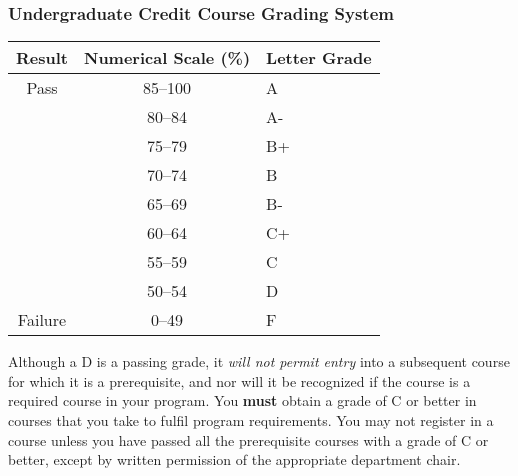 \subsubsection{Undergraduate Credit Course Grading System}

\begin{center}
  \begin{tabular}{ccl}
     Result & Numerical Scale (\%) & Letter Grade \\
   \hline
Pass & 85--100 & A  \\
& 80--84 & A- \\
& 75--79 & B+ \\
& 70--74 & B \\
& 65--69 & B- \\
& 60--64& C+ \\
& 55--59 & C \\
& 50--54 & D \\
\hline
Failure & 0--49 & F 
  \end{tabular}
  \end{center}

Although a D is a passing grade, it {\em will not permit entry} into a
subsequent course for which it is a prerequisite, and nor will it be
recognized if the course is a required course in your program. You
{\bf must} obtain a grade of C or better in courses that you take to
fulfil program requirements. You may not register in a course unless
you have passed all the prerequisite courses with a grade of C or
better, except by written permission of the appropriate department
chair.
